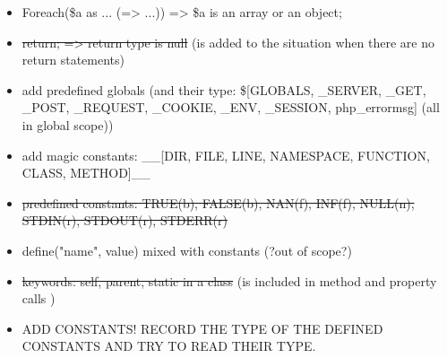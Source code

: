 \documentclass[../main.tex]{subfiles}
\begin{document}
\begin{itemize}
        \item Foreach(\$a as ... (=> ...)) => \$a is an array or an object;
        \item \sout{return; => return type is null} (is added to the situation when there are no return statements)
        \item add predefined globals (and their type: \$[GLOBALS, \_SERVER, \_GET, \_POST, \_REQUEST, \_COOKIE, \_ENV, \_SESSION, php\_errormsg] (all in global scope))
        \item add magic constants: \_\_[DIR, FILE, LINE, NAMESPACE, FUNCTION, CLASS, METHOD]\_\_
        \item \sout{predefined constants: TRUE(b), FALSE(b), NAN(f), INF(f), NULL(n), STDIN(r), STDOUT(r), STDERR(r)}
        \item define("name", value) mixed with constants (?out of scope?)
        \item \sout{keywords: self, parent, static in a class} (is included in method and property calls    )
        \item ADD CONSTANTS! RECORD THE TYPE OF THE DEFINED CONSTANTS AND TRY TO READ THEIR TYPE.    
    \end{itemize}

    \hrulefill
    
\end{document}
